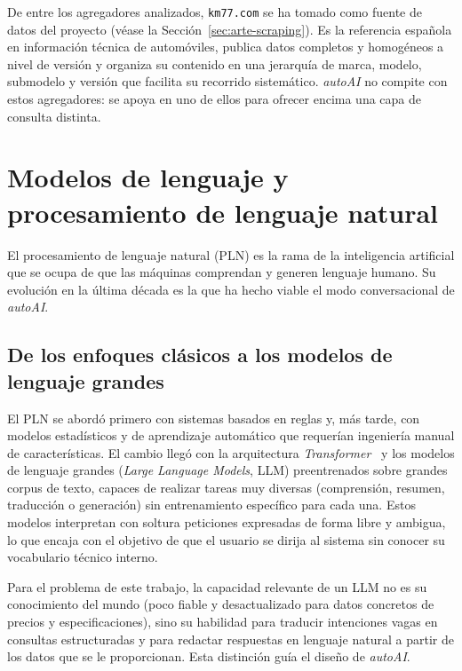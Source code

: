 De entre los agregadores analizados, \texttt{km77.com} se ha tomado como fuente de
datos del proyecto (véase la Sección~\ref{sec:arte-scraping}). Es la referencia
española en información técnica de automóviles, publica datos completos y
homogéneos a nivel de versión y organiza su contenido en una jerarquía de marca,
modelo, submodelo y versión que facilita su recorrido sistemático. \emph{autoAI}
no compite con estos agregadores: se apoya en uno de ellos para ofrecer encima una
capa de consulta distinta.


\section{Modelos de lenguaje y procesamiento de lenguaje natural}
\label{sec:arte-pln}

El procesamiento de lenguaje natural (PLN) es la rama de la inteligencia
artificial que se ocupa de que las máquinas comprendan y generen lenguaje humano.
Su evolución en la última década es la que ha hecho viable el modo conversacional
de \emph{autoAI}.

\subsection{De los enfoques clásicos a los modelos de lenguaje grandes}

El PLN se abordó primero con sistemas basados en reglas y, más tarde, con modelos
estadísticos y de aprendizaje automático que requerían ingeniería manual de
características. El cambio llegó con la arquitectura \emph{Transformer}~\cite{vaswani2017attention} y los
modelos de lenguaje grandes (\emph{Large Language Models}, LLM) preentrenados
sobre grandes corpus de texto, capaces de realizar tareas muy diversas
(comprensión, resumen, traducción o generación) sin entrenamiento específico para
cada una. Estos modelos interpretan con soltura peticiones expresadas de forma
libre y ambigua, lo que encaja con el objetivo de que el usuario se dirija al
sistema sin conocer su vocabulario técnico interno.

Para el problema de este trabajo, la capacidad relevante de un LLM no es su
conocimiento del mundo (poco fiable y desactualizado para datos concretos de
precios y especificaciones), sino su habilidad para traducir intenciones vagas en
consultas estructuradas y para redactar respuestas en lenguaje natural a partir de
los datos que se le proporcionan. Esta distinción guía el diseño de \emph{autoAI}.

